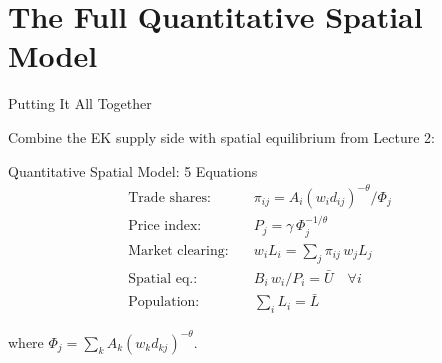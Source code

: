 \documentclass{beamer}
\begin{document}

\section{The Full Quantitative Spatial Model}

\begin{frame}{Putting It All Together}

    Combine the EK supply side with spatial equilibrium from Lecture 2:

    \vspace{0.3em}
    \begin{block}{Quantitative Spatial Model: 5 Equations}
    {\small
    \begin{align}
        \text{Trade shares:} \quad & \pi_{ij} = A_i (w_i d_{ij})^{-\theta}/\Phi_j \label{eq:ek_shares} \\[2pt]
        \text{Price index:} \quad & P_j = \gamma \, \Phi_j^{-1/\theta} \label{eq:ek_price} \\[2pt]
        \text{Market clearing:} \quad & w_i L_i = \sum_{j} \pi_{ij} \, w_j L_j \label{eq:ek_mc} \\[2pt]
        \text{Spatial eq.:} \quad & B_i \, w_i / P_i = \bar{U} \quad \forall i \label{eq:ek_spatial} \\[2pt]
        \text{Population:} \quad & \sum_i L_i = \bar{L} \label{eq:ek_pop}
    \end{align}
    }
    \end{block}

    \vspace{-0.3em}
    where $\Phi_j = \sum_k A_k (w_k d_{kj})^{-\theta}$.

\end{frame}
\end{document}
